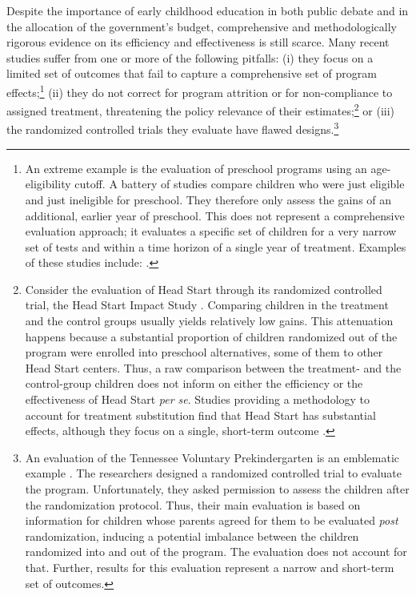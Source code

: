 \noindent Despite the importance of early childhood education in both public debate and in the allocation of the government's budget, comprehensive and methodologically rigorous evidence on its efficiency and effectiveness  is still scarce. Many recent studies suffer from one or more of the following pitfalls: (i) they focus on a limited set of outcomes that fail to capture a comprehensive set of program effects;\footnote{An extreme example is the evaluation of preschool programs using an age-eligibility cutoff. A battery of studies compare children who were just eligible and just ineligible for preschool. They therefore only assess the gains of an additional, earlier year of preschool. This does not represent a comprehensive evaluation approach; it evaluates a specific set of children for a very narrow set of tests and within a time horizon of a single year of treatment. Examples of these studies include: \citet{Gormley_Gayer_2005_JHR,Gormley_Gayer_etal_2005_DP,Weiland_2013_CD_Impacts-of-Pre-K}.} (ii) they do not correct for program attrition or for non-compliance to assigned treatment, threatening the policy relevance of their estimates;\footnote{Consider the evaluation of Head Start through its randomized controlled trial, the Head Start Impact Study \citep{Puma_Bell_etal_2010_HeadStartImpact}. Comparing children in the treatment and the control groups usually yields relatively low gains. This attenuation happens because a substantial proportion of children randomized out of the program were enrolled into preschool alternatives, some of them to other Head Start centers. Thus, a raw comparison between the treatment- and the control-group children does not inform on either the efficiency or the effectiveness of Head Start \emph{per se}. Studies providing a methodology to account for treatment substitution find that Head Start has substantial effects, although they focus on a single, short-term outcome \citep{Kline-Walters_2015_NBER-Evaluating,Feller_Grindal_etal_2016_ComparedtoWhat}.} or (iii) the randomized controlled trials they evaluate have flawed designs.\footnote{An evaluation of the Tennessee Voluntary Prekindergarten is an emblematic example \citep{Lipsey_et_al_2013_Tennessee_Kindergrtn_PRI,Lipsey_et_al_2015_Randomized_Control_Trial_PRI}. The researchers designed a randomized controlled trial to evaluate the program. Unfortunately, they asked permission to assess the children after the randomization protocol. Thus, their main evaluation is based on information for children whose parents agreed for them to be evaluated \textit{post} randomization, inducing a potential imbalance between the children randomized into and out of the program. The evaluation does not account for that. Further, results for this evaluation represent a narrow and short-term set of outcomes.}\\ 

